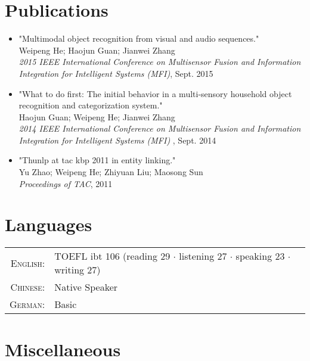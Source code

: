 \documentclass[a4paper,11pt]{article} %
\begin{document}
\section{Publications}
\begin{itemize}
  \item "Multimodal object recognition from visual and audio sequences." \\
    Weipeng He; Haojun Guan; Jianwei Zhang \\
    \textit{2015 IEEE International Conference on Multisensor Fusion and Information Integration for Intelligent Systems (MFI)}, Sept. 2015 

  \item "What to do first: The initial behavior in a multi-sensory household object recognition and categorization system." \\
    Haojun Guan; Weipeng He; Jianwei Zhang \\
    \textit{2014 IEEE International Conference on Multisensor Fusion and Information Integration for Intelligent Systems (MFI)} , Sept. 2014

  \item "Thunlp at tac kbp 2011 in entity linking." \\
    Yu Zhao; Weipeng He; Zhiyuan Liu; Maosong Sun \\
    \textit{Proceedings of TAC}, 2011
\end{itemize}


\section{Languages}

\begin{tabular}{rl}
  \textsc{English:} & TOEFL ibt 106 (reading 29 $\cdotp$ listening 27 $\cdotp$ speaking 23 $\cdotp$ writing 27) \\
  \textsc{Chinese:} & Native Speaker \\
  \textsc{German:} & Basic \\
\end{tabular}

\section{Miscellaneous}
\end{document}
